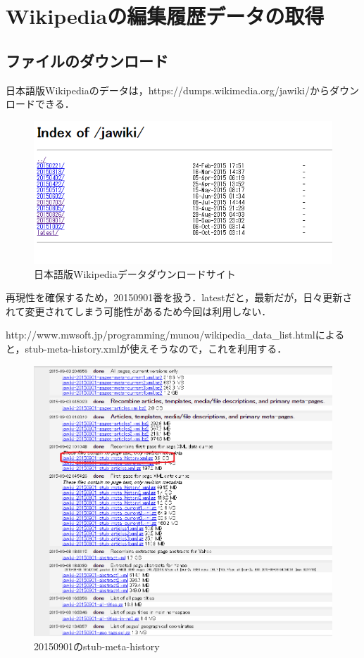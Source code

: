 \section{Wikipediaの編集履歴データの取得}

\subsection{ファイルのダウンロード}

日本語版Wikipediaのデータは，https://dumps.wikimedia.org/jawiki/からダウンロードできる．

\begin{figure}[H]
\centering
\includegraphics[width=14cm]{Index_of_jawiki.PNG}
\caption{日本語版Wikipediaデータダウンロードサイト}\label{サンプル図}
\end{figure}

再現性を確保するため，20150901番を扱う．latestだと，最新だが，日々更新されて変更されてしまう可能性があるため今回は利用しない．


http://www.mwsoft.jp/programming/munou/wikipedia\_data\_list.htmlによると，stub-meta-history.xmlが使えそうなので，これを利用する．

\begin{figure}[H]
\centering
\includegraphics[width=14cm]{wiki20150901.PNG}
\caption{20150901のstub-meta-history}\label{サンプル図}
\end{figure}



